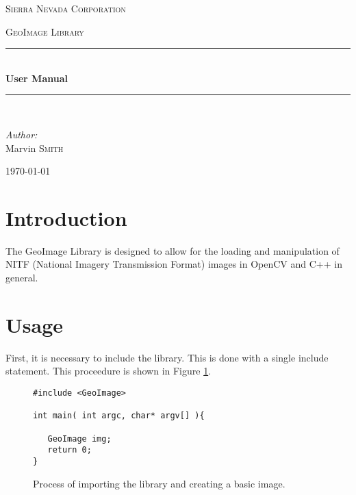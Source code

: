 \documentclass[10pt]{report}
\newcommand{\HRule}{\rule{\linewidth}{0.5mm}}
\begin{document}
\begin{titlepage}
\begin{center}

\vspace{10mm}

\textsc{\LARGE Sierra Nevada Corporation}\\[1.5cm]

\vspace{80mm}

\textsc{\Large GeoImage Library}\\[0.5cm]

\vspace{10mm}

\HRule \\[0.4cm]
{ \huge \bfseries User Manual}\\[0.4cm]

\HRule \\[1.5cm]

\begin{minipage}{0.4\textwidth}
\begin{center} \large
\emph{Author:}\\
Marvin \textsc{Smith}
\end{center}
\end{minipage}
\vfill
{\large \today}
\end{center}
\end{titlepage}
\newpage

\section*{Introduction}

The GeoImage Library is designed to allow for the loading and manipulation 
of NITF (National Imagery Transmission Format) images in OpenCV and C++ in
general.

\section*{Usage}

First, it is necessary to include the library.  This is done with a single
include statement. This proceedure is shown in Figure \ref{fig:basic01}. 


\begin{figure}[!h]
\begin{lstlisting}
#include <GeoImage>

int main( int argc, char* argv[] ){
   
   GeoImage img;
   return 0;
}

\end{lstlisting}
\caption{Process of importing the library and creating a basic image.}
\label{fig:basic01}
\end{figure}
\end{document}

